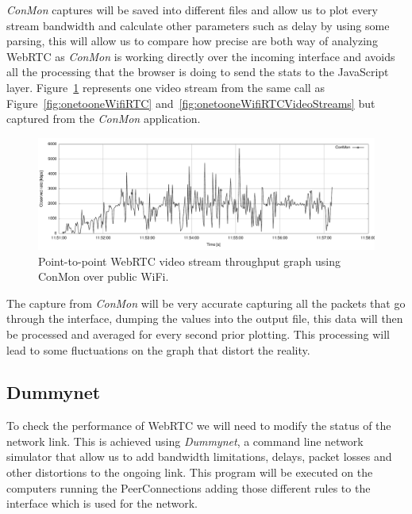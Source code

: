 {\it ConMon} captures will be saved into different files and allow us to plot every stream bandwidth and calculate other parameters such as delay by using some parsing, this will allow us to compare how precise are both way of analyzing WebRTC as {\it ConMon} is working directly over the incoming interface and avoids all the processing that the browser is doing to send the stats to the JavaScript layer. Figure~\ref{fig:onetooneWifiRTCConMon} represents one video stream from the same call as Figure~\ref{fig:onetooneWifiRTC} and~\ref{fig:onetooneWifiRTCVideoStreams} but captured from the {\it ConMon} application.

 \begin{figure}[h]
  \centering
    \includegraphics[width=1\textwidth]{./figures/onetooneWiFiConMon.pdf}
      \caption[Point-to-point WebRTC video stream throughput graph using ConMon over public WiFi]{Point-to-point WebRTC video stream throughput graph using ConMon over public WiFi.}
	\label{fig:onetooneWifiRTCConMon}
\end{figure}

The capture from {\it ConMon} will be very accurate capturing all the packets that go through the interface, dumping the values into the output file, this data will then be processed and averaged for every second prior plotting. This processing will lead to some fluctuations on the graph that distort the reality.

\subsection{Dummynet}

To check the performance of WebRTC we will need to modify the status of the network link. This is achieved using {\it Dummynet}, a command line network simulator that allow us to add bandwidth limitations, delays, packet losses and other distortions to the ongoing link. This program will be executed on the computers running the PeerConnections adding those different rules to the interface which is used for the network.

